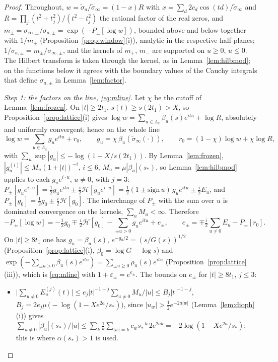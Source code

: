 \documentclass[11pt]{article}
\theoremstyle{definition}
\theoremstyle{remark}
\begin{document}
\begin{proof}
Throughout, $w=\tilde\sigma_a/\tilde\sigma_\infty=(1-x)R$ with $x=\sum_d2c_d\cos(td)/\tilde\sigma_\infty$ and $R=\prod_j(t^2+t_j^2)/(t^2-t_j^2)$ the rational factor of the real zeros, and $m_\pm=\sigma_{\infty,\pm}/\sigma_{a,\pm}=\exp(-P_\pm[\log w])$, bounded above and below together with $1/m_\pm$ (Proposition~\ref{prop:window}(i)), analytic in the respective half-planes; $1/\sigma_{a,\pm}=m_\pm/\sigma_{\infty,\pm}$, and the kernels of $m_+$, $m_-$ are supported on $u\ge0$, $u\le0$. The Hilbert transform is taken through the kernel, as in Lemma~\ref{lem:hilbmod}; on the functions below it agrees with the boundary values of the Cauchy integrals that define $\sigma_{a,\pm}$ in Lemma~\ref{lem:factor}.

\emph{Step 1: the factors on the line, \eqref{eq:mline}.} Let $\chi$ be the cutoff of Lemma~\ref{lem:frozen}. On $|t|\ge2t_1$, $s(t)\ge s(2t_1)>X$, so Proposition~\ref{prop:lattice}(i) gives $\log w=\sum_{u\in\Lambda_a}\beta_u(s)e^{itu}+\log R$, absolutely and uniformly convergent; hence on the whole line
\[
\log w=\sum_{u\in\Lambda_a}g_ue^{itu}+r_0,\qquad g_u=\chi\,\beta_u(\tilde\sigma_\infty(\cdot)),\qquad r_0=(1-\chi)\log w+\chi\log R ,
\]
with $\sum_u\sup|g_u|\le-\log(1-X/s(2t_1))$. By Lemma~\ref{lem:frozen}, $|g_u^{(i)}|\le M_u(1+|t|)^{-i}$, $i\le6$, $M_u=\mu|\beta_u|(s_*)$, so Lemma~\ref{lem:hilbmod} applies to each $g_ue^{i\cdot u}$, $u\ne0$, with $j=3$: $P_\pm[g_ue^{i\cdot u}]=\tfrac12g_ue^{itu}\pm\tfrac i2\mathcal H[g_ue^{i\cdot u}]=\tfrac12(1\pm\mathrm{sign}\,u)\,g_ue^{itu}\pm\tfrac i2E_u$, and $P_\pm[g_0]=\tfrac12g_0\pm\tfrac i2\mathcal H[g_0]$. The interchange of $P_\pm$ with the sum over $u$ is dominated convergence on the kernels, $\sum_uM_u<\infty$. Therefore
\[
-P_\pm[\log w]=-\tfrac12g_0\mp\tfrac i2\mathcal H[g_0]-\sum_{\pm u>0}g_ue^{itu}+e_\pm,\qquad e_\pm=\mp\tfrac i2\sum_{u\ne0}E_u-P_\pm[r_0].
\]
On $|t|\ge8t_1$ one has $g_u=\beta_u(s)$, $e^{-g_0/2}=(s/G(s))^{1/2}$ (Proposition~\ref{prop:lattice}(i), $\beta_0=\log G-\log s$) and $\exp(-\sum_{\pm u>0}\beta_u(s)e^{itu})=\sum_{\pm u\ge0}\rho_u(s)e^{itu}$ (Proposition~\ref{prop:lattice}(iii)), which is \eqref{eq:mline} with $1+\varepsilon_\pm=e^{e_\pm}$. The bounds on $e_\pm$ for $|t|\ge8t_1$, $j\le3$:
\begin{itemize}
\item[(a)] $\big|\sum_{u\ne0}E_u^{(j)}(t)\big|\le e_j|t|^{-1-j}\sum_{u\ne0}M_u/|u|\le B_j|t|^{-1-j}$, $B_j=2e_j\mu\,\big(-\log(1-Xe^{2a}/s_*)\big)$, since $|u_w|>\tfrac12e^{-2a|w|}$ (Lemma~\ref{lem:dioph}(i)) gives $\sum_{u\ne0}|\beta_u|(s_*)/|u|\le\sum_k\frac1k\sum_{|w|=k}c_ws_*^{-k}\,2e^{2ak}=-2\log(1-Xe^{2a}/s_*)$; this is where $\alpha(s_*)>1$ is used.

\end{itemize}
\end{proof}
\end{document}
